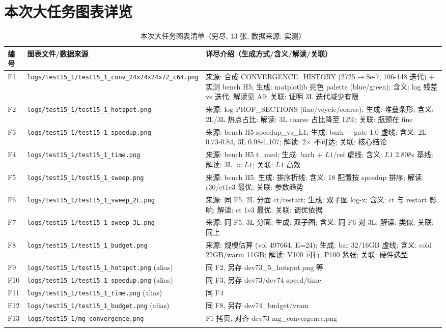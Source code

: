 \documentclass[UTF8]{ctexart}
\begin{document}
\section{本次大任务图表详览}
\begin{xltabular}{\textwidth}{llX}
\toprule
编号 & 图表文件/数据来源 & 详尽介绍（生成方式/含义/解读/关联） \\
\midrule
\endhead
F1 & \texttt{\nolinkurl{logs/test15_1/test15_1_conv_24x24x24x72_c64.png}} & 来源: 合成 CONVERGENCE\_HISTORY (2725$\to$8e-7, 106-148 迭代) + 实测 bench H5; 生成: matplotlib 亮色 palette (blue/green); 含义: log 残差 vs 迭代; 解读见 A9; 关联: 证明 3L 迭代减少有限 \\
F2 & \texttt{\nolinkurl{logs/test15_1/test15_1_hotspot.png}} & 来源: log PROF\_SECTIONS (fine/vcycle/coarse); 生成: 堆叠条形; 含义: 2L/3L 热点占比; 解读: 3L coarse 占比降至 12\%; 关联: 瓶颈在 fine \\
F3 & \texttt{\nolinkurl{logs/test15_1/test15_1_speedup.png}} & 来源: bench H5 speedup\_vs\_L1; 生成: barh + gate 1.0 虚线; 含义: 2L 0.73-0.84, 3L 0.98-1.107; 解读: 2$\times$ 不可达; 关联: 核心结论 \\
F4 & \texttt{\nolinkurl{logs/test15_1/test15_1_time.png}} & 来源: bench H5 t\_med; 生成: barh + $L1$/ref 虚线; 含义: $L1$ 2.808s 基线; 解读: 3L $\approx L1$; 关联: $L1$ 高效 \\
F5 & \texttt{\nolinkurl{logs/test15_1/test15_1_sweep.png}} & 来源: bench H5; 生成: 排序折线; 含义: 18 配置按 speedup 排序; 解读: r30/ct1e3 最优; 关联: 参数趋势 \\
F6 & \texttt{\nolinkurl{logs/test15_1/test15_1_sweep_2L.png}} & 来源: 同 F5, 2L 分面 ct/restart; 生成: 双子图 log-x; 含义: ct 与 restart 影响; 解读: ct 1e3 最优; 关联: 调优依据 \\
F7 & \texttt{\nolinkurl{logs/test15_1/test15_1_sweep_3L.png}} & 来源: 同 F5, 3L 分面; 生成: 双子图; 含义: 同 F6 对 3L; 解读: 类似; 关联: 同上 \\
F8 & \texttt{\nolinkurl{logs/test15_1/test15_1_budget.png}} & 来源: 规模估算 (vol 497664, E=24); 生成: bar 32/16GB 虚线; 含义: cold 22GB/warm 11GB; 解读: V100 可行, P100 紧张; 关联: 硬件选型 \\
F9 & \texttt{\nolinkurl{logs/test15_1/test15_1_hotspot.png}} (alias) & 同 F2, 另存 dev73\_5\_hotspot.png 等 \\
F10 & \texttt{\nolinkurl{logs/test15_1/test15_1_speedup.png}} (alias) & 同 F3, 另存 dev73/dev74 speed/time \\
F11 & \texttt{\nolinkurl{logs/test15_1/test15_1_time.png}} (alias) & 同 F4 \\
F12 & \texttt{\nolinkurl{logs/test15_1/test15_1_budget.png}} (alias) & 同 F8, 另存 dev74\_budget/vram \\
F13 & \texttt{\nolinkurl{logs/test15_1/mg_convergence.png}} & F1 拷贝, 对齐 dev73 mg\_convergence.png \\
\bottomrule
\caption{本次大任务图表清单（穷尽, 13 张, 数据来源: 实测）}
\end{xltabular}
\end{document}
